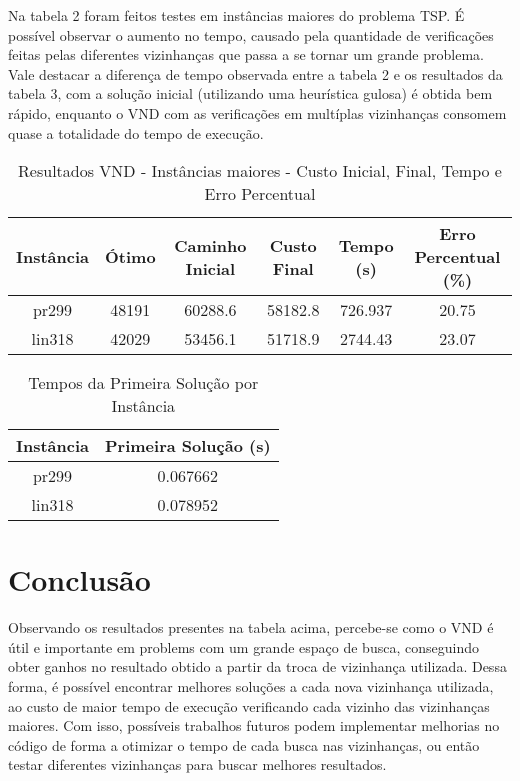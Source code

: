 \documentclass[10pt]{extarticle} %
\begin{document}
Na tabela 2 foram feitos testes em instâncias maiores do problema TSP. É possível observar o aumento no tempo, causado pela quantidade de verificações feitas pelas diferentes vizinhanças que passa a se tornar um grande problema. Vale destacar a diferença de tempo observada entre a tabela 2 e os resultados da tabela 3, com a solução inicial (utilizando uma heurística gulosa) é obtida bem rápido, enquanto o VND com as verificações em multíplas vizinhanças consomem quase a totalidade do tempo de execução.

\begin{table}[h]
    \centering
    \begin{tabular}{|c|c|c|c|c|c|} \hline 
         \textbf{Instância} & \textbf{Ótimo} & \textbf{Caminho Inicial} & \textbf{Custo Final} & \textbf{Tempo (s)} & \textbf{Erro Percentual (\%)}\\ \hline 
         pr299      & 48191    & 60288.6      & 58182.8    & 726.937   & 20.75  \\ \hline
         lin318     & 42029    & 53456.1      & 51718.9    & 2744.43   & 23.07  \\ \hline
    \end{tabular}
    \caption{Resultados VND - Instâncias maiores - Custo Inicial, Final, Tempo e Erro Percentual}
    \label{tab:comparison_with_initial}
\end{table}

\begin{table}[h]
    \centering
    \begin{tabular}{|c|c|} \hline 
         \textbf{Instância} & \textbf{Primeira Solução (s)} \\ \hline 
         pr299      & 0.067662 \\ \hline
         lin318     & 0.078952 \\ \hline
    \end{tabular}
    \caption{Tempos da Primeira Solução por Instância}
    \label{tab:first_solution_times}
\end{table}


\section{Conclusão}

Observando os resultados presentes na tabela acima, percebe-se como o VND é útil e importante em problems com um grande espaço de busca, conseguindo obter ganhos no resultado obtido a partir da troca de vizinhança utilizada. Dessa forma, é possível encontrar melhores soluções a cada nova vizinhança utilizada, ao custo de maior tempo de execução verificando cada vizinho das vizinhanças maiores. Com isso, possíveis trabalhos futuros podem implementar melhorias no código de forma a otimizar o tempo de cada busca nas vizinhanças, ou então testar diferentes vizinhanças para buscar melhores resultados.
\end{document}

